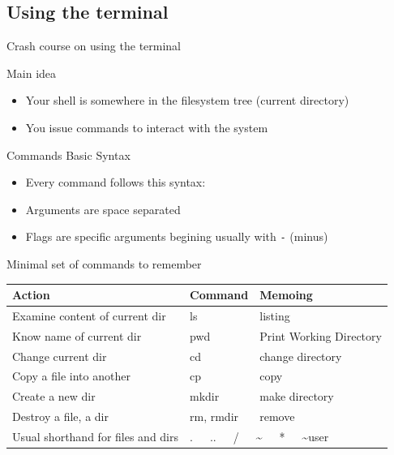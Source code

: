 \subsection{Using the terminal}
\begin{frame}{Crash course on using the terminal}
  \begin{block}{Main idea}
    \begin{itemize}
    \item Your shell is somewhere in the filesystem tree (current directory)
    \item You issue commands to interact with the system
    \end{itemize}
  \end{block}\vspace{-.6\baselineskip}

  \begin{block}{Commands Basic Syntax}
    \begin{itemize}
    \item Every command follows this syntax: 
    \item Arguments are space separated
    \item Flags are specific arguments begining usually with \texttt{-} (minus)
    \end{itemize}
  \end{block}\vspace{-.6\baselineskip}

  \begin{block}{Minimal set of commands to remember}\medskip
    \begin{tabular}{|l|l|l|}\hline
      \textbf{Action} & \textbf{Command} & \textbf{Memoing}\\\hline
      Examine content of current dir&ls&listing \\\hline
      Know name of current dir&pwd&Print Working Directory\\\hline
      Change current dir&cd&change directory\\\hline
      Copy a file into another&cp&copy\\
      Create a new dir&mkdir&make directory\\\hline
      Destroy a file, a dir&rm, rmdir&remove\\\hline
      Usual shorthand for files and dirs&\multicolumn{2}{|l|}{.~~~..~~~/~~~\~{}~~~*~~~\~{}user}\\\hline
    \end{tabular}
  \end{block}
\end{frame}
